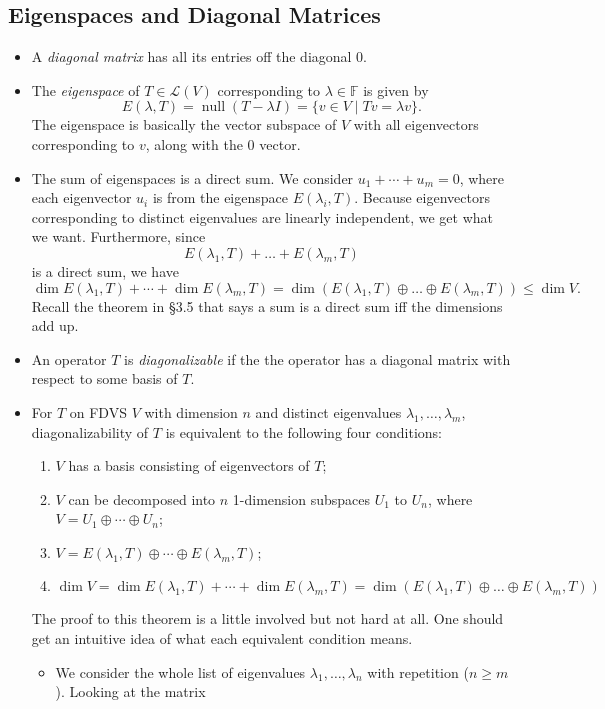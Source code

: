 \documentclass{article}
\newcommand{\F}{\mathbb{F}}
\newcommand{\n}{\operatorname{null}}
\renewcommand{\d}{\dim}
\newcommand{\LV}{\mathcal{L}(V)}
\begin{document}
\subsection{Eigenspaces and Diagonal Matrices}
\begin{itemize}
    \item A \textit{diagonal matrix} has all its entries off the diagonal 0.
    \item The \textit{eigenspace} of $T \in \LV$ corresponding to $\lambda \in \F$ is given by $$E(\lambda,T) = \n (T-\lambda I) = \{v \in V \mid Tv = \lambda v\}.$$
    The eigenspace is basically the vector subspace of $V$ with all eigenvectors corresponding to $v$, along with the 0 vector.
    \item The sum of eigenspaces is a direct sum. We consider $u_1+\cdots+u_m = 0$, where each eigenvector $u_i$ is from the eigenspace $E(\lambda_i,T)$. Because eigenvectors corresponding to distinct eigenvalues are linearly independent, we get what we want. Furthermore, since $$E(\lambda_1,T)+\dots+E(\lambda_m,T)$$ is a direct sum, we have $$\d E(\lambda_1,T) + \cdots + \d E(\lambda_m,T) = \d (E(\lambda_1,T) \oplus \dots \oplus E(\lambda_m,T)) \leq \d V.$$ Recall the theorem in \S3.5 that says a sum is a direct sum iff the dimensions add up.
    \item An operator $T$ is \textit{diagonalizable} if the the operator has a diagonal matrix with respect to some basis of $T$.
    \item For $T$ on FDVS $V$ with dimension $n$ and distinct eigenvalues $\lambda_1, \dots, \lambda_m$, diagonalizability of $T$ is equivalent to the following four conditions:
    \begin{enumerate}[label=(\alph*)]
        \item $V$ has a basis consisting of eigenvectors of $T$;
        \item $V$ can be decomposed into $n$ 1-dimension subspaces $U_1$ to $U_n$, where $V = U_1 \oplus \cdots \oplus U_n$;
        \item $V = E(\lambda_1,T) \oplus \cdots \oplus E(\lambda_m,T)$;
        \item $\d V = \d E(\lambda_1,T) + \cdots + \d E(\lambda_m,T) = \d (E(\lambda_1,T) \oplus \dots \oplus E(\lambda_m,T))$
    \end{enumerate}
    The proof to this theorem is a little involved but not hard at all. One should get an intuitive idea of what each equivalent condition means.
    \begin{itemize}
    \item We consider the whole list of eigenvalues $\lambda_1, \dots, \lambda_n$ with repetition ($n \geq m$). Looking at the matrix

\end{itemize}
\end{itemize}
\end{document}

